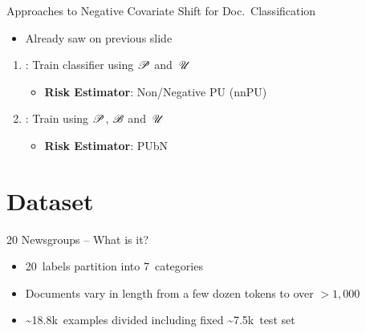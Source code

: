 \begin{frame}{Approaches to Negative Covariate Shift for Doc.\ Classification}
  \begin{itemize}[<+->]
    \item Already saw on previous slide
  \end{itemize}
  \vfill
  \begin{enumerate}[<+->][a]
    \setlength{\itemsep}{12pt}
    \item \textbf{}: Train classifier using $\mathscr{P}$ and~$\mathscr{U}$~\cite{Fei:2015}
      \begin{itemize}
        \item \textbf{Risk Estimator}: Non\-/Negative PU (nnPU)~\cite{Kiryo:2017}
      \end{itemize}
    \item \textbf{}: Train using $\mathscr{P}$, $\mathscr{B}$ and~$\mathscr{U}$
      \begin{itemize}
        \item \textbf{Risk Estimator}: PUbN~\cite{Hsieh:2018}
      \end{itemize}
  \end{enumerate}
\end{frame}

\section{Dataset}
\begin{frame}{20 Newsgroups -- What is it?}
  \begin{itemize}
    \item 20~labels partition into 7~categories 
    \item Documents vary in length from a few dozen tokens to over ${{>}1,000}$
  \end{itemize}
  \vfill
   
  \begin{itemize}[<+->]
    \item \textasciitilde18.8k~examples divided including fixed \textasciitilde7.5k~test set
  \end{itemize}
  \vfill
  {
    \begin{center}
      \scriptsize
      \onslide<+->{}
    \end{center}
  }
\end{frame}


